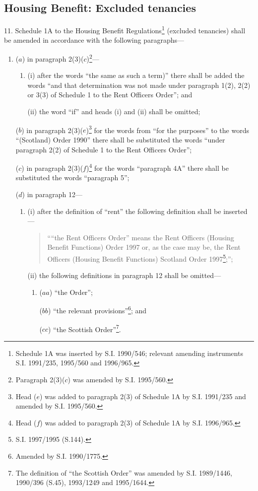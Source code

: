 \documentclass[12pt,a4paper]{article}
\begin{document}
\subsection[11. Housing Benefit: Excluded tenancies]{Housing Benefit: Excluded tenancies}

11.  Schedule 1A to the Housing Benefit Regulations\footnote{\frenchspacing Schedule 1A was inserted by S.I. 1990/546; relevant amending instruments S.I. 1991/235, 1995/560 and 1996/965.} (excluded tenancies) shall be amended in accordance with the following paragraphs—
\begin{enumerate}\item[]
($a$) in paragraph 2(3)($c$)\footnote{\frenchspacing Paragraph 2(3)($c$) was amended by S.I. 1995/560.}—
\begin{enumerate}\item[]
(i) after the words “the same as such a term)” there shall be added the words “and that determination was not made under paragraph 1(2), 2(2) or 3(3) of Schedule 1 to the Rent Officers Order”; and

(ii) the word “if” and heads (i)  and (ii)  shall be omitted;
\end{enumerate}

($b$) in paragraph 2(3)($e$)\footnote{\frenchspacing Head ($e$) was added to paragraph 2(3) of Schedule 1A by S.I. 1991/235 and amended by S.I. 1995/560.} for the words from “for the purposes” to the words “(Scotland) Order 1990” there shall be substituted the words “under paragraph 2(2) of Schedule 1 to the Rent Officers Order”;

($c$) in paragraph 2(3)($f$)\footnote{\frenchspacing Head ($f$) was added to paragraph 2(3) of Schedule 1A by S.I. 1996/965.} for the words “paragraph 4A” there shall be substituted the words “paragraph 5”;

($d$) in paragraph 12—
\begin{enumerate}\item[]
(i) after the definition of “rent” the following definition shall be inserted—
\begin{quotation}
““the Rent Officers Order” means the Rent Officers (Housing Benefit Functions) Order 1997 or, as the case may be, the Rent Officers (Housing Benefit Functions) Scotland Order 1997\footnote{\frenchspacing S.I. 1997/1995 (S.144).};”;
\end{quotation}

(ii) the following definitions in paragraph 12 shall be omitted—
\begin{enumerate}\item[]
($aa$) “the Order”;

($bb$) “the relevant provisions”\footnote{\frenchspacing Amended by S.I. 1990/1775.}; and

($cc$) “the Scottish Order”\footnote{\frenchspacing The definition of “the Scottish Order” was amended by S.I. 1989/1446, 1990/396 (S.45), 1993/1249 and 1995/1644.}.
\end{enumerate}
\end{enumerate}
\end{enumerate}
\end{document}
